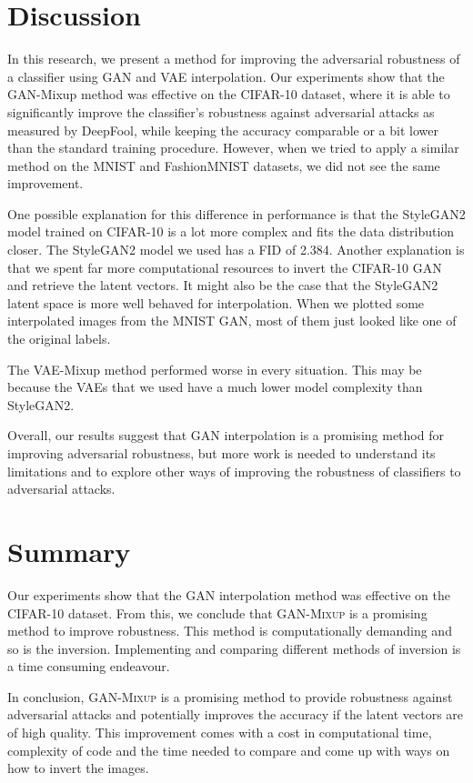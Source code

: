 \documentclass[nohyperref]{article}
\theoremstyle{plain}
\theoremstyle{definition}
\theoremstyle{remark}
\begin{document}
\section{Discussion}
In this research, we present a method for improving the adversarial robustness of a classifier using GAN and VAE interpolation. Our experiments show that the GAN-Mixup method was effective on the CIFAR-10 dataset, where it is able to significantly improve the classifier's robustness against adversarial attacks as measured by DeepFool, while keeping the accuracy comparable or a bit lower than the standard training procedure. However, when we tried to apply a similar method on the MNIST and FashionMNIST datasets, we did not see the same improvement.

One possible explanation for this difference in performance is that the StyleGAN2 model trained on CIFAR-10 is a lot more complex and fits the data distribution closer. The StyleGAN2 model we used has a FID of 2.384. 
Another explanation is that we spent far more computational resources to invert the CIFAR-10 GAN and retrieve the latent vectors. 
It might also be the case that the StyleGAN2 latent space is more well behaved for interpolation. When we plotted some interpolated images from the MNIST GAN, most of them just looked like one of the original labels.

The VAE-Mixup method performed worse in every situation. This may be because the VAEs that we used have a much lower model complexity than StyleGAN2.

Overall, our results suggest that GAN interpolation is a promising method for improving adversarial robustness, but more work is needed to understand its limitations and to explore other ways of improving the robustness of classifiers to adversarial attacks.


\section{Summary}
Our experiments show that the GAN interpolation method was effective on the CIFAR-10 dataset. From this, we conclude that \textsc{GAN-Mixup} is a promising method to improve robustness. This method is computationally demanding and so is the inversion. Implementing and comparing different methods of inversion is a time consuming endeavour.

In conclusion, \textsc{GAN-Mixup} is a promising method to provide robustness against adversarial attacks and potentially improves the accuracy if the latent vectors are of high quality. This improvement comes with a cost in computational time, complexity of code and the time needed to compare and come up with ways on how to invert the images.
\end{document}
